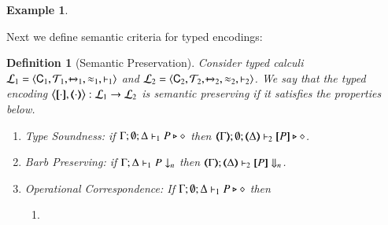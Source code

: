 \documentclass[preprint,11pt]{elsarticle}
\newtheorem{definition}{Definition}[section]
\newtheorem{example}{Example}[section]
\begin{document}
{{\begin{example}
\end{example}

Next we define semantic criteria for typed encodings:


\begin{definition}[Semantic Preservation]%
\label{def:ep}
       Consider typed calculi %
        $\mathcal{L}_1=\langle \mathsf{C}_1, {\cal{T}}_1, \xmapsto{~}_1, \approx_1, \vdash_1 \rangle$
       and $\mathcal{L}_2=\langle \mathsf{C}_2, {\cal{T}}_2, \xmapsto{~}_2, \approx_2, \vdash_2 \rangle$.
We say that the typed encoding $\enco{\map{\cdot}, \mapt{\cdot}}: \tyl{L}_1 \to \tyl{L}_2$ is \emph{semantic preserving}
if it satisfies the properties below.
	
	\begin{enumerate}[1.]
		\item \emph{Type Soundness}:
	if
	$\Gamma; \emptyset; \Delta \vdash_1 P \triangleright \diamond$ then 
	$\mapt{\Gamma}; \emptyset; \mapt{\Delta} \proves_2 \map{P} \hastype \Proc$.

			\item \emph{Barb Preserving}: if $\Gamma; \Delta \vdash_1 P \downarrow_{n}$
		then $\mapt{\Gamma}; \mapt{\Delta} \proves_2 \map{P} \Barb{n}$.

	\item \emph{Operational Correspondence}: If $\Gamma; \emptyset; \Delta \vdash_1 P \triangleright \diamond$ then
		\begin{enumerate}
			\item	{}
				

\end{enumerate}
\end{enumerate}
\end{definition}}}
\end{document}
